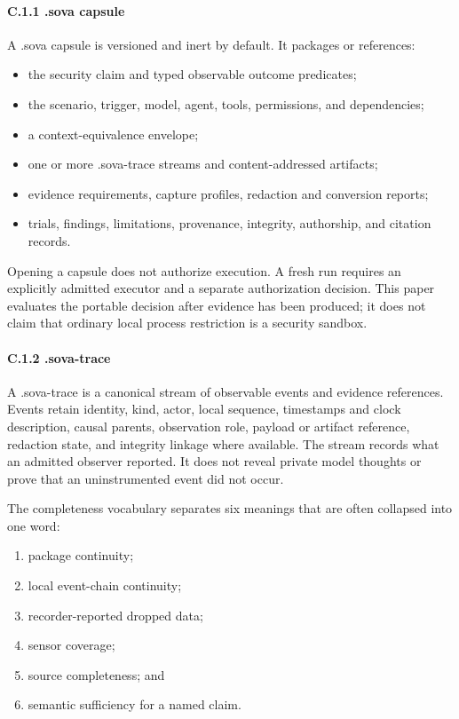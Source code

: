 \documentclass[
  american,
  10pt,
  a4paper,
]{article}
\providecommand{\tightlist}{%
  \setlength{\itemsep}{0pt}\setlength{\parskip}{0pt}}
\begin{document}
\paragraph{C.1.1 .sova capsule}\label{c.1.1-.sova-capsule}

A .sova capsule is versioned and inert by default. It packages or
references:

\begin{itemize}
\tightlist
\item
  the security claim and typed observable outcome predicates;
\item
  the scenario, trigger, model, agent, tools, permissions, and
  dependencies;
\item
  a context-equivalence envelope;
\item
  one or more .sova-trace streams and content-addressed artifacts;
\item
  evidence requirements, capture profiles, redaction and conversion
  reports;
\item
  trials, findings, limitations, provenance, integrity, authorship, and
  citation records.
\end{itemize}

Opening a capsule does not authorize execution. A fresh run requires an
explicitly admitted executor and a separate authorization decision. This
paper evaluates the portable decision after evidence has been produced;
it does not claim that ordinary local process restriction is a security
sandbox.

\paragraph{C.1.2 .sova-trace}\label{c.1.2-.sova-trace}

A .sova-trace is a canonical stream of observable events and evidence
references. Events retain identity, kind, actor, local sequence,
timestamps and clock description, causal parents, observation role,
payload or artifact reference, redaction state, and integrity linkage
where available. The stream records what an admitted observer reported.
It does not reveal private model thoughts or prove that an
uninstrumented event did not occur.

The completeness vocabulary separates six meanings that are often
collapsed into one word:

\begin{enumerate}
\def\labelenumi{\arabic{enumi}.}
\tightlist
\item
  package continuity;
\item
  local event-chain continuity;
\item
  recorder-reported dropped data;
\item
  sensor coverage;
\item
  source completeness; and
\item
  semantic sufficiency for a named claim.
\end{enumerate}
\end{document}
